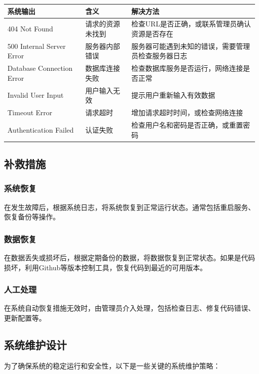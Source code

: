 \documentclass[12pt]{article}
\begin{document}
\begin{table}[H]
    \centering
    \begin{tabular}{|m{5cm}<{\centering}|m{3.5cm}<{\centering}|m{6cm}<{\centering}|}
    \hline
    \textbf{系统输出} & \textbf{含义} & \textbf{解决方法} \\ \hline
    404 Not Found & 请求的资源未找到 & 检查URL是否正确，或联系管理员确认资源是否存在 \\ \hline
    500 Internal Server Error & 服务器内部错误 & 服务器可能遇到未知的错误，需要管理员检查服务器日志 \\ \hline
    Database Connection Error & 数据库连接失败 & 检查数据库服务是否运行，网络连接是否正常 \\ \hline
    Invalid User Input & 用户输入无效 & 提示用户重新输入有效数据 \\ \hline
    Timeout Error & 请求超时 & 增加请求超时时间，或检查网络连接 \\ \hline
    Authentication Failed & 认证失败 & 检查用户名和密码是否正确，或重置密码 \\ \hline
    \end{tabular}
\end{table}

\subsection{补救措施}
\subsubsection{系统恢复}
在发生故障后，根据系统日志，将系统恢复到正常运行状态。通常包括重启服务、恢复备份等操作。

\subsubsection{数据恢复}
在数据丢失或损坏后，根据定期备份的数据，将数据恢复到正常状态。如果是代码损坏，利用Github等版本控制工具，恢复代码到最近的可用版本。

\subsubsection{人工处理}
在系统自动恢复措施无效时，由管理员介入处理，包括检查日志、修复代码错误、更新配置等。

\subsection{系统维护设计}
为了确保系统的稳定运行和安全性，以下是一些关键的系统维护策略：
\end{document}
